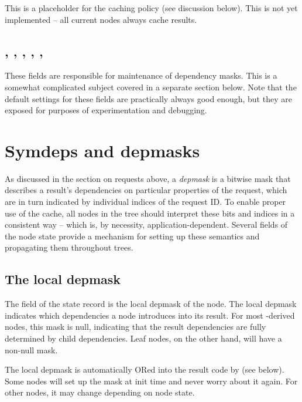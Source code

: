 \documentclass[10pt]{article}
\begin{document}
  This is a placeholder for the caching policy (see discussion below). This is
  not yet implemented -- all current nodes always cache results.

\subsection{, , , 
            , , }
              
  These fields are responsible for maintenance of dependency masks. This is a
  somewhat complicated subject covered in a separate section below. Note that
  the default settings for these fields are practically always good enough, but
  they are exposed for purposes of experimentation and debugging.

\section{Symdeps and depmasks}

  As discussed in the section on requests above, a {\em depmask} is a bitwise
  mask that describes a result's dependencies on particular properties of the
  request, which are in turn indicated by individual indices of the request ID.
  To enable proper use of the cache, all nodes in the tree should interpret
  these bits and indices in a consistent way -- which is, by necessity,
  application-dependent. Several fields of the node state provide a mechanism
  for setting up these semantics and propagating them throughout trees. 

\subsection{The local depmask}
  
  The  field of the state record is the local depmask of the
  node. The local depmask indicates which dependencies a node introduces into
  its result. For most -derived nodes, this mask is null,
  indicating that the result dependencies are fully determined by child
  dependencies. Leaf nodes, on the other hand, will have a non-null mask.

  The local depmask is automatically ORed into the result code by
   (see below). Some nodes will set up the mask at init
  time and never worry about it again. For other nodes, it may change depending
  on node state.
\end{document}
